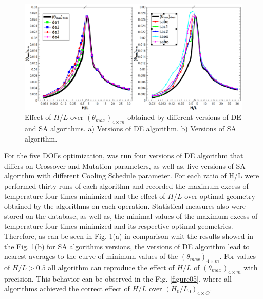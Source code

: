 \documentclass[12pt,fleqn]{article}
\begin{document}
\begin{figure}[H]
\centering
\includegraphics[width=1\linewidth]{imgs/5dof/de_sa_hl_tmin.png}
\caption{ {\small Effect of $H/L$ over $({\theta}_{max})_{4\times m}$ obtained by different versions of DE and SA algorithms. a) Versions of DE algorithm. b) Versions of SA algorithm.}}
\label{figure04}
\end{figure}
For the five DOFs optimization, was run four versions of DE algorithm that differs on Crossover and Mutation parameters, as well as, five versions of SA algorithm with different Cooling Schedule parameter.
For each ratio of H/L were performed thirty runs of each algorithm and recorded the maximum excess of temperature four times minimized and the effect of $H/L$ over optimal geometry obtained by the algorithms on each operation. Statistical measures also were stored on the database, as well as, the minimal values of the maximum excess of temperature four times minimized and its respective optimal geometries. Therefore, as can be seen in Fig. \ref{figure04}(a) in comparison whit the results showed in the Fig. \ref{figure04}(b) for SA algorithms versions, the versions of DE algorithm lead to nearest averages to the curve of minimum values of the $({\theta}_{max})_{4\times m}$. For values of $H/L > 0.5$ all algorithm can reproduce the effect of $H/L$ of $({\theta}_{max})_{4\times m}$ with precision. This behavior can be observed in the Fig. \ref{figure05}, where all algorithms achieved the correct effect of $H/L$ over ${(H_{0}/L_{0})_{4\times O}}$.
\end{document}

